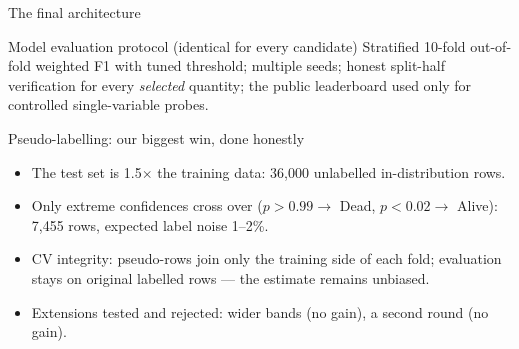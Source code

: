 \documentclass[aspectratio=169,10pt]{beamer}
\begin{document}
\begin{frame}{The final architecture}
  \centering
  \vspace{10pt}
  \begin{block}{Model evaluation protocol (identical for every candidate)}
    Stratified 10-fold out-of-fold weighted F1 with tuned threshold; multiple seeds;
    honest split-half verification for every \emph{selected} quantity;
    the public leaderboard used only for controlled single-variable probes.
  \end{block}
\end{frame}

\begin{frame}{Pseudo-labelling: our biggest win, done honestly}
  \begin{itemize}
    \item The test set is 1.5$\times$ the training data: 36{,}000 unlabelled in-distribution rows.
    \item Only extreme confidences cross over ($p>0.99 \rightarrow$ Dead, $p<0.02 \rightarrow$ Alive):
          7{,}455 rows, expected label noise 1--2\%.
    \item \alert{CV integrity:} pseudo-rows join only the training side of each fold;
          evaluation stays on original labelled rows --- the estimate remains unbiased.
    \item Extensions tested and rejected: wider bands (no gain), a second round (no gain).
  \end{itemize}
\end{frame}
\end{document}
